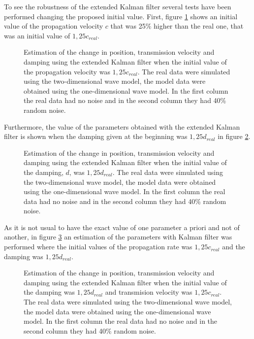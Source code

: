 \documentclass[12pt, a4paper]{article} %
\begin{document}
	\newpage
	To see the robustness of the extended Kalman filter several tests have been performed changing the proposed initial value.  
	First, figure \ref{fig:kalman1c} shows an initial value of the propagation velocity $c$ that was 25\% higher than the real one, that was an initial value of $1,25 c_{real}$.
	
	\begin{figure}[h!]
		\centering
		
		\caption{Estimation of the change in position, transmission velocity and damping using the extended Kalman filter when the initial value of the propagation velocity was $1,25 c_{real}$. The real data were simulated using the two-dimensional wave model, the model data were obtained using the one-dimensional wave model. In the first column the real data had no noise and in the second column they had 40\% random noise.}
		\label{fig:kalman1c}
	\end{figure}
	
	\newpage
	Furthermore, the value of the parameters obtained with the extended Kalman filter is shown when the damping given at the beginning was $1,25 d_{real}$ in figure \ref{fig:kalman1d}.
	
	\begin{figure}[h!]
		\centering
		
		\caption{Estimation of the change in position, transmission velocity and damping using the extended Kalman filter when the initial value of the damping, $d$, was $ 1,25 d_{real}$. The real data were simulated using the two-dimensional wave model, the model data were obtained using the one-dimensional wave model. In the first column the real data had no noise and in the second column they had 40\% random noise.}
		\label{fig:kalman1d}
	\end{figure}
	
	\newpage
	
	As it is not usual to have the exact value of one parameter a priori and not of another, in figure \ref{fig:kalman1dc} an estimation of the parameters with Kalman filter was performed where the initial values of the propagation rate was $1,25 c_{real}$ and the damping was $1,25 d_{real}$.
	
	\newpage
	
	\begin{figure}[h!]
		\centering
		
		\caption{Estimation of the change in position, transmission velocity and damping using the extended Kalman filter when the initial value of the damping was $1,25 d_{real}$ and transmision velocity was $1,25 c_{real}$. The real data were simulated using the two-dimensional wave model, the model data were obtained using the one-dimensional wave model. In the first column the real data had no noise and in the second column they had 40\% random noise.}
		\label{fig:kalman1dc}
	\end{figure}
	
\end{document}
